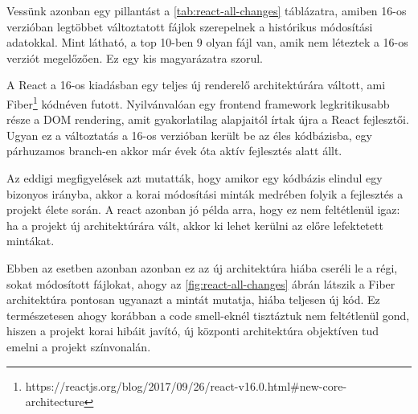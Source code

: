 Vessünk azonban egy pillantást a \ref{tab:react-all-changes} táblázatra, amiben 16-os verzióban legtöbbet változtatott fájlok szerepelnek a histórikus módosítási adatokkal. Mint látható, a top 10-ben 9 olyan fájl van, amik nem léteztek a 16-os verziót megelőzően. Ez egy kis magyarázatra szorul.

A React a 16-os kiadásban egy teljes új renderelő architektúrára váltott, ami Fiber\footnote{https://reactjs.org/blog/2017/09/26/react-v16.0.html\#new-core-architecture} kódnéven futott. Nyilvánvalóan egy frontend framework legkritikusabb része a DOM rendering, amit gyakorlatilag alapjaitól írtak újra a React fejlesztői. Ugyan ez a változtatás a 16-os verzióban került be az éles kódbázisba, egy párhuzamos branch-en akkor már évek óta aktív fejlesztés alatt állt.

Az eddigi megfigyelések azt mutatták, hogy amikor egy kódbázis elindul egy bizonyos irányba, akkor a korai módosítási minták medrében folyik a fejlesztés a projekt élete során. A react azonban jó példa arra, hogy ez nem feltétlenül igaz: ha a projekt új architektúrára vált, akkor ki lehet kerülni az előre lefektetett mintákat.

Ebben az esetben azonban azonban ez az új architektúra hiába cseréli le a régi, sokat módosított fájlokat, ahogy az \ref{fig:react-all-changes} ábrán látszik a Fiber architektúra pontosan ugyanazt a mintát mutatja, hiába teljesen új kód. Ez természetesen ahogy korábban a code smell-eknél tisztáztuk nem feltétlenül gond, hiszen a projekt korai hibáit javító, új központi architektúra objektíven tud emelni a projekt színvonalán.

